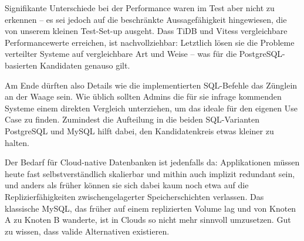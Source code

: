 Signifikante Unterschiede bei der Performance waren im Test aber nicht zu erkennen – es sei jedoch auf die beschränkte Aussagefähigkeit hingewiesen, die von unserem kleinen Test-Set-up ausgeht. Dass TiDB und Vitess vergleichbare Performancewerte erreichen, ist nachvollziehbar: Letztlich lösen sie die Probleme verteilter Systeme auf vergleichbare Art und Weise – was für die PostgreSQL-basierten Kandidaten genauso gilt.

Am Ende dürften also Details wie die implementierten SQL-Befehle das Zünglein an der Waage sein. Wie üblich sollten Admins die für sie infrage kommenden Systeme einem direkten Vergleich unterziehen, um das ideale für den eigenen Use Case zu finden. Zumindest die Aufteilung in die beiden SQL-Varianten PostgreSQL und MySQL hilft dabei, den Kandidatenkreis etwas kleiner zu halten.

Der Bedarf für Cloud-native Datenbanken ist jedenfalls da: Applikationen müssen heute fast selbstverständlich skalierbar und mithin auch implizit redundant sein, und anders als früher können sie sich dabei kaum noch etwa auf die Replizierfähigkeiten zwischengelagerter Speicherschichten verlassen. Das klassische MySQL, das früher auf einem replizierten Volume lag und von Knoten A zu Knoten B wanderte, ist in Clouds so nicht mehr sinnvoll umzusetzen. Gut zu wissen, dass valide Alternativen existieren. 


